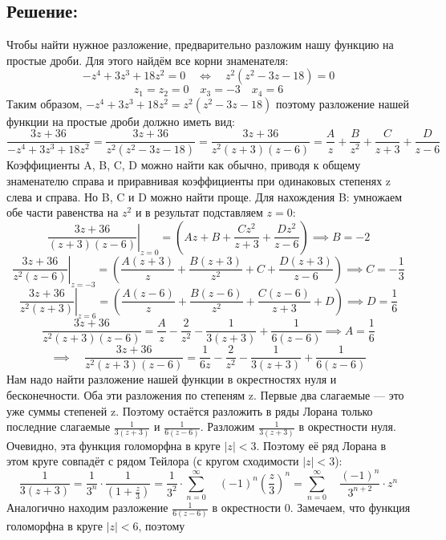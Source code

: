 \documentclass{article}
\begin{document}
	\subsection{Решение:}
        Чтобы найти нужное разложение, предварительно разложим нашу функцию на простые дроби. Для этого найдём все корни знаменателя: 
        $$-z^4 + 3z^3 + 18z^2 = 0 \quad \Leftrightarrow \quad z^2(z^2 - 3z - 18) = 0$$
        $$
        z_1 = z_2 = 0 \quad x_3 = -3 \quad x_4 = 6
        $$
        Таким образом, $-z^4 + 3z^3 + 18z^2 = z^2(z^2 - 3z - 18)$ поэтому разложение
        нашей функции на простые дроби должно иметь вид: 
        $$\frac{3z + 36}{-z^4 + 3z^3 + 18z^2} = \frac{3z + 36}{z^2(z^2 - 3z - 18)} = \frac{3z + 36}{z^2(z + 3)(z - 6)} = \frac{A}{z} + \frac{B}{z^2} + \frac{C}{z + 3} + \frac{D}{z - 6}$$
        Коэффициенты A, B, C, D можно найти как обычно, приводя к общему знаменателю справа и приравнивая коэффициенты при одинаковых степенях z слева и справа. Но B, C и D можно найти проще. Для нахождения B: умножаем обе части равенства на $z^2$ и в результат подставляем $z = 0$: 
        $$\left. \frac{3z + 36}{(z + 3)(z - 6)} \right|_{z = 0} = (Az + B + \frac{Cz^2}{z + 3} + \frac{Dz^2}{z - 6}) \implies B = -2 $$
        $$\left. \frac{3z + 36}{z^2(z - 6)} \right|_{z = -3} = (\frac{A(z + 3)}{z}+ \frac{B(z + 3)}{z^2} + C + \frac{D(z + 3)}{z - 6} ) \implies C = -\frac{1}{3} $$
        $$\left. \frac{3z + 36}{z^2(z + 3)} \right|_{z = 6} = (\frac{A(z - 6)}{z}+ \frac{B(z - 6)}{z^2} + \frac{C(z - 6)}{z + 3} + D) \implies D = \frac{1}{6} $$
        $$\frac{3z + 36}{z^2(z + 3)(z - 6)} = \frac{A}{z} - \frac{2}{z^2} - \frac{1}{3(z + 3)} + \frac{1}{6(z - 6)} \implies A = \frac{1}{6}$$
        $$\implies \quad \frac{3z + 36}{z^2(z + 3)(z - 6)} = \frac{1}{6z} - \frac{2}{z^2} - \frac{1}{3(z + 3)} + \frac{1}{6(z - 6)}$$
        Нам надо найти разложение нашей функции в окрестностях нуля и бесконечности. Оба эти разложения по степеням z. Первые два слагаемые — это уже суммы степеней z. Поэтому остаётся разложить в ряды Лорана только последние слагаемые $\frac{1}{3(z + 3)}$ и  $\frac{1}{6(z - 6)}$.
        Разложим $\frac{1}{3(z + 3)}$ в окрестности нуля. Очевидно, эта функция голоморфна в круге $|z| < 3$. Поэтому её ряд Лорана в этом круге совпадёт с рядом Тейлора (с кругом сходимости $|z| < 3$):
        $$\frac{1}{3(z + 3)} = \frac{1}{3^n} \cdot \frac{1}{(1 + \frac{z}{3})} = \frac{1}{3^2} \cdot \sum\limits_{n=0}^{\infty} \quad (-1)^n (\frac{z}{3})^n = \sum\limits_{n=0}^{\infty} \quad \frac{(-1)^n}{3^{n + 2}} \cdot z^n$$ 
        Аналогично находим разложение $\frac{1}{6(z - 6)}$ в окрестности 0. Замечаем, что функция голоморфна в круге  $|z| < 6$, поэтому
\end{document}
